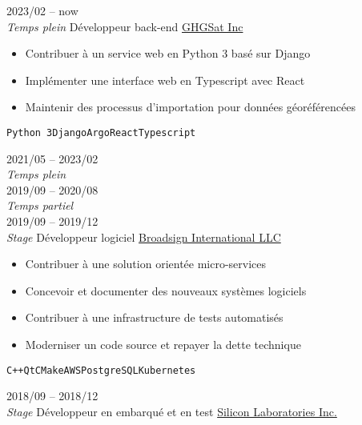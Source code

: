 \documentclass[9pt]{developercv} %
\begin{document}
\begin{minipage}[t]{0.8\textwidth}

\begin{entrylist}
	\entry
		{2023/02 -- now\\{\small\emph{Temps plein}}}
		{Développeur back-end}
		{\href{https://ghgsat.com/fr/}{GHGSat Inc}}
		{
			\vspace{-14pt}
			\begin{itemize}
				\renewcommand{\labelitemi}{\raisebox{.45ex}{\rule{.6ex}{.6ex}}}
				\setlength\itemsep{-1pt}
				\item Contribuer à un service web en Python 3 basé sur Django
				\item Implémenter une interface web en Typescript avec React
				\item Maintenir des processus d'importation pour données géoréférencées
			\end{itemize}
			\vspace{-4pt}
			\texttt{Python 3}\slashsep\texttt{Django}\slashsep\texttt{Argo}\slashsep\texttt{React}\slashsep\texttt{Typescript}
		}
	\entry
		{2021/05 -- 2023/02\\{\small\emph{Temps plein}}\\2019/09 -- 2020/08\\{\small\emph{Temps partiel}}\\2019/09 -- 2019/12\\{\small\emph{Stage}}}
		{Développeur logiciel}
		{\href{https://broadsign.com/}{Broadsign International LLC}}
		{
			\vspace{-14pt}
			\begin{itemize}
				\renewcommand{\labelitemi}{\raisebox{.45ex}{\rule{.6ex}{.6ex}}}
				\setlength\itemsep{-1pt}
				\item Contribuer à une solution orientée micro-services
				\item Concevoir et documenter des nouveaux systèmes logiciels
				\item Contribuer à une infrastructure de tests automatisés
				\item Moderniser un code source et repayer la dette technique
			\end{itemize}
			\vspace{-4pt}
			\texttt{C++}\slashsep\texttt{Qt}\slashsep\texttt{CMake}\slashsep\texttt{AWS}\slashsep\texttt{PostgreSQL}\slashsep\texttt{Kubernetes}
		}
	\entry
		{2018/09 -- 2018/12\\{\small\emph{Stage}}}
		{Développeur en embarqué et en test}
		{\href{https://www.silabs.com/}{Silicon Laboratories Inc.}}

\end{entrylist}
\end{minipage}
\end{document}
